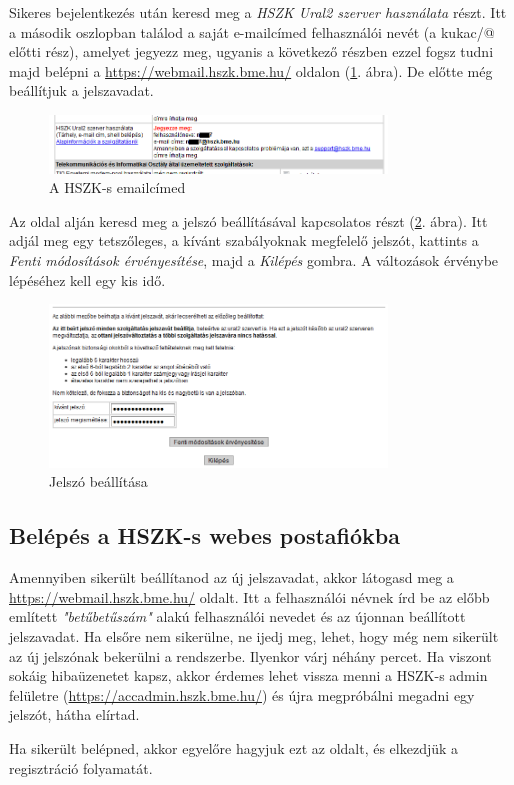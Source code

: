 \documentclass[a4paper,10pt,titlepage]{article}
\begin{document}
Sikeres bejelentkezés után keresd meg a \textit{HSZK Ural2 szerver használata} részt. Itt a második oszlopban találod a saját e-mailcímed felhasználói nevét (a kukac/@ előtti rész), amelyet jegyezz meg, ugyanis a következő részben ezzel fogsz tudni majd belépni a \href{https://webmail.hszk.bme.hu/}{https://webmail.hszk.bme.hu/} oldalon (\ref{fig:hszk_acc_admin_mailcim}. ábra). De előtte még beállítjuk a jelszavadat.

\begin{figure}[h!]
\centering
\includegraphics[width=0.80\textwidth]{figures/hszk_acc_admin_mailcim.png}
\caption{A HSZK-s emailcímed \label{fig:hszk_acc_admin_mailcim}}
\end{figure}

Az oldal alján keresd meg a jelszó beállításával kapcsolatos részt (\ref{fig:hszk_acc_admin_jelszo}. ábra). Itt adjál meg egy tetszőleges, a kívánt szabályoknak megfelelő jelszót, kattints a \textit{Fenti módosítások érvényesítése}, majd a \textit{Kilépés} gombra. A változások érvénybe lépéséhez kell egy kis idő. 

\begin{figure}[h!]
\centering
\includegraphics[width=0.80\textwidth]{figures/hszk_acc_admin_jelszo.png}
\caption{Jelszó beállítása \label{fig:hszk_acc_admin_jelszo}}
\end{figure}

\subsection{Belépés a HSZK-s webes postafiókba}

Amennyiben sikerült beállítanod az új jelszavadat, akkor látogasd meg a \href{https://webmail.hszk.bme.hu/}{https://webmail.hszk.bme.hu/} oldalt. Itt a felhasználói névnek írd be az előbb említett \textit{"betűbetűszám"} alakú felhasználói nevedet és az újonnan beállított jelszavadat. Ha elsőre nem sikerülne, ne ijedj meg, lehet, hogy még nem sikerült az új jelszónak bekerülni a rendszerbe. Ilyenkor várj néhány percet. Ha viszont sokáig hibaüzenetet kapsz, akkor érdemes lehet vissza menni a HSZK-s admin felületre (\href{https://accadmin.hszk.bme.hu/}{https://accadmin.hszk.bme.hu/}) és újra megpróbálni megadni egy jelszót, hátha elírtad.

Ha sikerült belépned, akkor egyelőre hagyjuk ezt az oldalt, és elkezdjük a regisztráció folyamatát.
\end{document}
